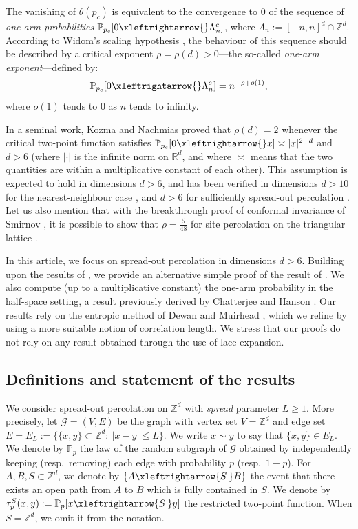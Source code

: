 \documentclass[11pt,a4paper]{article}
\numberwithin{equation}{section}
\theoremstyle{plain}
\theoremstyle{definition}
\newcommand{\connect}{\xleftrightarrow}
\newcommand{\Z}{\mathbb{Z}}
\newcommand{\1}{\mathbf 1}
\def\P{\mathbb{P}} %
\def\bf{\bfseries}
\begin{document}
		The vanishing of $\theta(p_c)$ is equivalent to the convergence to $0$ of the sequence of \emph{one-arm probabilities} $\mathbb P_{p_c}[0\connect{}\Lambda_n^c]$, where $\Lambda_n:=[-n,n]^d\cap \mathbb Z^d$. According to Widom's scaling hypothesis \cite{Widom1965equation}, the behaviour of this sequence should be described by a critical exponent $\rho=\rho(d)>0$---the so-called \emph{one-arm exponent}---defined by:
		\begin{equation}\label{eq:intro one arm proba}
			\mathbb P_{p_c}[0\connect{}\Lambda_n^c]=n^{-\rho+o(1)},
		\end{equation}
where $o(1)$ tends to $0$ as $n$ tends to infinity.

In a seminal work, Kozma and Nachmias \cite{KozmaNachmias} proved that $\rho(d)=2$ whenever the critical two-point function satisfies $\mathbb P_{p_c}[0\connect{}x]\asymp |x|^{2-d}$ and $d>6$ (where $|\cdot|$ is the infinite norm on $\mathbb R^d$, and where $\asymp$ means that the two quantities are within a multiplicative constant of each other). This assumption is expected to hold in dimensions $d>6$, and has been verified in dimensions $d>10$ for the nearest-neighbour case \cite{HaraSlade1990Perco,HaraDecayOfCorrelationsInVariousModels2008,FitznervdHofstad2017Percod10}, and $d>6$ for sufficiently spread-out percolation \cite{HaraSladevdHofstad2003PercoSO,DumPan24Perco}. Let us also mention that with the breakthrough proof of conformal invariance of Smirnov \cite{SmirnovCardy2001}, it is possible to show that $\rho=\tfrac{5}{48}$ for site percolation on the triangular lattice \cite{lawler2002one}.

In this article, we focus on spread-out percolation in dimensions $d>6$. Building upon the results of \cite{DumPan24Perco}, we provide an alternative simple proof of the result of \cite{KozmaNachmias}.
We also compute (up to a multiplicative constant) the one-arm probability in the half-space setting, a result previously derived by Chatterjee and Hanson \cite{ChatterjeeHanson}. Our results rely on the entropic method of Dewan and Muirhead \cite{DewanMuirhead}, which we refine by using a more suitable notion of correlation length. We stress that our proofs do not rely on any result obtained through the use of lace expansion.
	
	\subsection{Definitions and statement of the results}	
	We consider spread-out percolation on $\Z^d$ with \emph{spread} parameter $L\geq1$. More precisely, let $\mathcal G=(V,E)$ be the graph with vertex set $V=\Z^d$ and edge set $E=E_L:=\{\{x,y\}\subset \Z^d:~|x-y|\leq L\}$. We write $x\sim y$ to say that $\{x,y\}\in E_L$. We denote by $\P_p$ the law of the random subgraph of $\mathcal G$ obtained by independently keeping (resp.~removing) each edge with probability $p$ (resp.~$1-p$). For $A,B,S\subset \Z^d$, we denote by $\{A \connect{S\:} B\}$ the event that there exists an open path from $A$ to $B$ which is fully contained in $S$. We denote by $\tau^S_p(x,y):=\mathbb P_{p}[x\connect{S\:}y]$ the restricted two-point function. When $S=\Z^d$, we omit it from the notation. 
	
\end{document}
